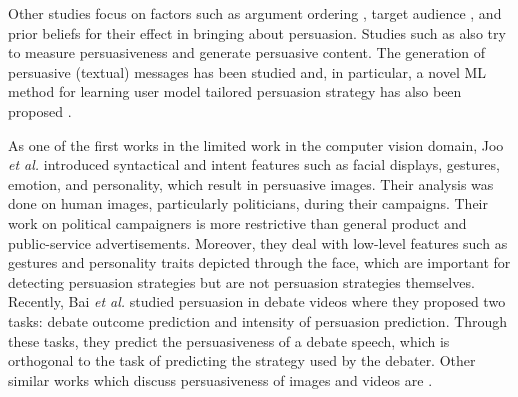 Other studies focus on factors such as argument ordering \cite{shaikh-etal-2020-examining,li-etal-2020-exploring-role}, target audience \cite{lukin-etal-2017-argument}, and prior beliefs \cite{el-baff-etal-2020-analyzing} for their effect in bringing about persuasion. Studies such as \cite{althoff2014ask,wei2016post} also try to measure persuasiveness and generate persuasive content. The generation of persuasive (textual) messages has been studied \cite{donadello2020explaining} and, in particular, a novel ML method for learning user model tailored persuasion strategy has also been proposed \cite{hadoux2021strategic, donadello2022machine}.



As one of the first works in the limited work in the computer vision domain, Joo \textit{et al.} \cite{joo2014visual} introduced syntactical and intent features such as facial displays, gestures, emotion, and personality, which result in persuasive images. Their analysis was done on human images, particularly politicians, during their campaigns. %
Their work on political campaigners is more restrictive than general product and public-service advertisements. Moreover, they deal with low-level features such as gestures and personality traits depicted through the face, which are important for detecting persuasion strategies but are not persuasion strategies themselves. Recently, Bai \textit{et al.} \cite{bai2021m2p2} studied persuasion in debate videos where they proposed two tasks: debate outcome prediction and intensity of persuasion prediction. Through these tasks, they predict the persuasiveness of a debate speech, which is orthogonal to the task of predicting the strategy used by the debater. Other similar works which discuss persuasiveness of images and videos are \cite{joo2015automated,siddiquie2015exploiting}.






